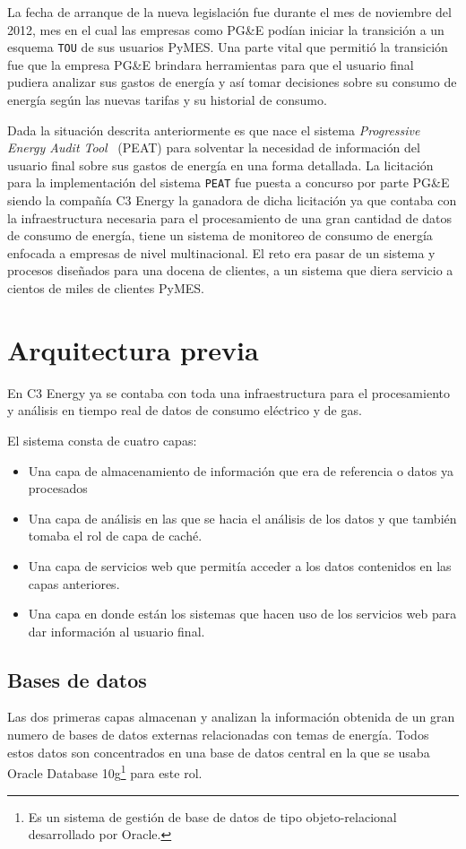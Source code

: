 La fecha de arranque de la nueva legislación fue durante el mes de noviembre
del 2012, mes en el cual las empresas como PG\&E podían iniciar la transición
a un esquema \texttt{TOU} de sus usuarios PyMES.
Una parte vital que permitió la transición fue que la empresa PG\&E brindara
herramientas para que el usuario final pudiera analizar sus gastos de energía
y así tomar decisiones sobre su consumo de energía según las nuevas tarifas
y su historial de consumo.

Dada la situación descrita anteriormente es que nace el sistema
\textit{Progressive Energy Audit Tool} \ (PEAT) para solventar la necesidad
de información del usuario final sobre sus gastos de energía en una forma detallada.
La licitación para la implementación del sistema \texttt{PEAT} fue puesta
a concurso por parte PG\&E siendo la compañía C3 Energy la ganadora de dicha
licitación  ya que contaba con la infraestructura necesaria para el
procesamiento de una gran cantidad de datos de consumo de energía,
tiene un sistema de monitoreo de consumo de energía enfocada a empresas de nivel
multinacional. El reto era pasar de un sistema y procesos diseñados
para una docena de clientes, a un sistema que diera servicio a
cientos de miles de clientes PyMES.

\section{Arquitectura previa}
En C3 Energy ya se contaba con toda una infraestructura para el
procesamiento y análisis en tiempo real de datos de consumo eléctrico
y de gas.

El sistema consta de cuatro capas:

\begin{itemize}
\item Una capa de almacenamiento de información que era de referencia
  o datos ya procesados
\item Una capa de análisis en las que se hacia el análisis de los datos
  y que también tomaba el rol de capa de caché.
\item Una capa de servicios web que permitía acceder a los datos contenidos
  en las capas anteriores.
\item Una capa en donde están los sistemas que hacen uso de los
  servicios web para dar información al usuario final.
\end{itemize}

\subsection{Bases de datos}
Las dos primeras capas almacenan y analizan la información obtenida
de un gran numero de bases de datos externas relacionadas con temas
de energía. Todos estos datos son concentrados en una base de datos
central en la que se usaba Oracle Database 10g\footnote{Es un sistema de
  gestión de base de datos de tipo objeto-relacional desarrollado por Oracle.}
para este rol.

